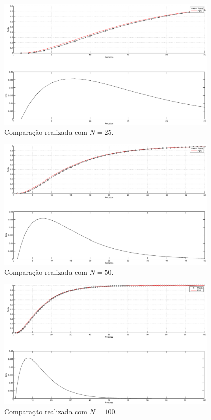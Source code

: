 \begin{figure}[htb]
\centering
    \includegraphics[width=0.95\textwidth]{imgs/questao1/item_c_N_25}
    \caption{Comparação realizada com $N = 25$.}
    \label{fig:item_c_25}
\end{figure}

\begin{figure}[htb]
\centering
    \includegraphics[width=0.95\textwidth]{imgs/questao1/item_c_N_50}
    \caption{Comparação realizada com $N = 50$.}
    \label{fig:item_c_50}
\end{figure}

\begin{figure}[H]
\centering
    \includegraphics[width=0.95\textwidth]{imgs/questao1/item_c_N_100}
    \caption{Comparação realizada com $N = 100$.}
    \label{fig:item_c_100}
\end{figure}

